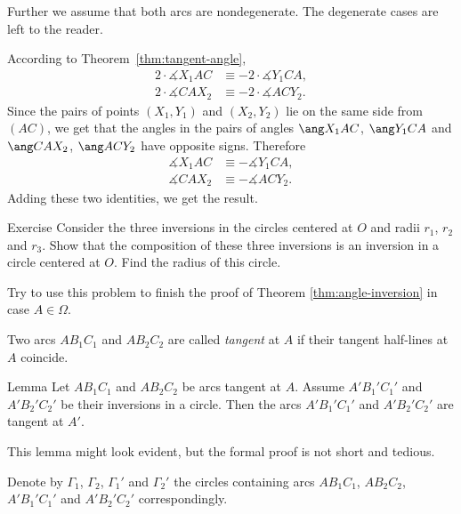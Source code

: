 Further we assume that both arcs are nondegenerate.
The degenerate cases are left to the reader.

According to Theorem~\ref{thm:tangent-angle},
\begin{align*}
2\cdot \measuredangle X_1AC
&\equiv -2\cdot \measuredangle Y_1CA,
\\
2\cdot \measuredangle CAX_2
&\equiv -2\cdot \measuredangle ACY_2.
\end{align*}
Since the pairs of points $(X_1, Y_1)$ and $(X_2, Y_2)$
lie on the same side from $(AC)$,
we get that the  angles in the pairs of angles 
$\ang X_1AC$, $\ang Y_1CA$ 
and $\ang CAX_2$, $\ang ACY_2$
have opposite signs.
Therefore 
\begin{align*}
\measuredangle X_1AC
&\equiv - \measuredangle Y_1CA,
\\
 \measuredangle CAX_2
&\equiv - \measuredangle ACY_2.
\end{align*}
Adding these two identities, we get the result.
\qeds








\begin{thm}{Exercise}\label{ex:3-inverions}
Consider the three inversions
in the circles centered at $O$ and radii $r_1$, $r_2$ and $r_3$.
Show that the composition of these three inversions is an inversion in a circle centered at $O$.
Find the radius of this circle.

Try to use this problem to finish the proof of Theorem \ref{thm:angle-inversion} in case $A\in\Omega$.
\end{thm}







Two arcs $AB_1C_1$ and $AB_2C_2$ are called \emph{tangent} at $A$ if their tangent half-lines at $A$ coincide.

\begin{thm}{Lemma}\label{lem:tangent-to-tangent}
Let $AB_1C_1$ and $AB_2C_2$ be arcs tangent at $A$.
Assume $A'B_1'C_1'$ and $A'B_2'C_2'$ be their inversions in a circle.
Then the arcs $A'B_1'C_1'$ and $A'B_2'C_2'$ are tangent at $A'$.
\end{thm}

This lemma might look evident, 
but the formal proof is not short and tedious.

Denote by $\Gamma_1$, $\Gamma_2$, $\Gamma_1'$ and $\Gamma_2'$ the circles containing arcs $AB_1C_1$, $AB_2C_2$, $A'B_1'C_1'$ and $A'B_2'C_2'$ correspondingly.

